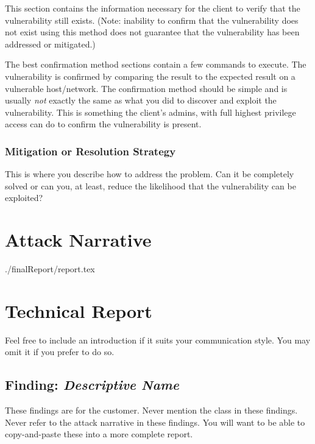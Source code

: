 		This section contains the information necessary for the
		client to verify that the vulnerability still exists.
		(Note: inability to confirm that the vulnerability
		does not exist using this method does not
		guarantee that the vulnerability has been addressed
		or mitigated.)
		
		The best confirmation method sections contain a few commands
		to execute. The vulnerability is confirmed by comparing
		the result to the expected result on a vulnerable
		host/network. The confirmation method should be simple
		and is usually \emph{not} exactly the same as what you
		did to discover and exploit the vulnerability.
		This is something the client's admins, with full
		highest privilege access can do to confirm the
		vulnerability is present.
		
    \subsubsection*{Mitigation or Resolution Strategy}
    
    	This is where you describe how to address the problem.
    	Can it be completely solved or can you, at least, reduce the
    	likelihood that the vulnerability can be exploited?
		



\section{Attack Narrative}
./finalReport/report.tex

\section{Technical Report}

Feel free to include an introduction if it suits your communication style.
You may omit it if you prefer to do so.


  \subsection{Finding: \emph{Descriptive Name}}
  
    These findings are for the customer.
    Never mention the class in these findings.
    Never refer to the attack narrative in these findings.
    You will want to be able to copy-and-paste these into a more complete report.


